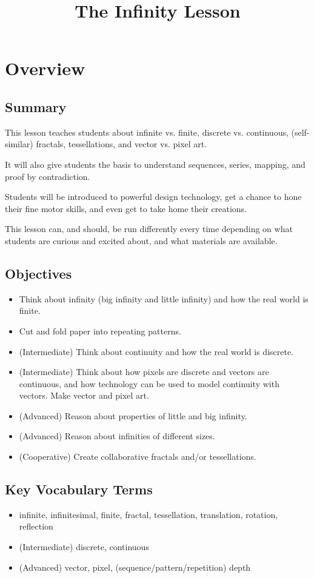 \documentclass{lessonplan}
\title{The Infinity Lesson}
\author{\linkHome}
\date{}
\begin{document}
  \maketitle

  \section{Overview}
    \subsection{Summary}
      This lesson teaches students about infinite vs. finite, discrete vs. continuous, (self-similar) fractals, 
      tessellations, and vector vs. pixel art.

      It will also give students the basis to understand sequences, series, mapping, and proof by contradiction. 

      Students will be introduced to powerful design technology, get a chance to hone their fine motor skills, and 
      even get to take home their creations.

      This lesson can, and should, be run differently every time depending on what students are curious and excited
      about, and what materials are available.
    \subsection{Objectives}
    \begin{itemize}
      \item Think about infinity (big infinity and little infinity) and how the real world is finite.
      \item Cut and fold paper into repeating patterns.
      \item (Intermediate) Think about continuity and how the real world is discrete.
      \item (Intermediate) Think about how pixels are discrete and vectors are continuous, and how technology can be 
        used to model continuity with vectors. Make vector and pixel art.
      \item (Advanced) Reason about properties of little and big infinity.
      \item (Advanced) Reason about infinities of different sizes.
      \item (Cooperative) Create collaborative fractals and/or tessellations.
    \end{itemize}
    \subsection{Key Vocabulary Terms}
    \begin{itemize}
      \item infinite, infinitesimal, finite, fractal, tessellation, translation, rotation, reflection
      \item (Intermediate) discrete, continuous
      \item (Advanced) vector, pixel, (sequence/pattern/repetition) depth
    \end{itemize}
\end{document}
